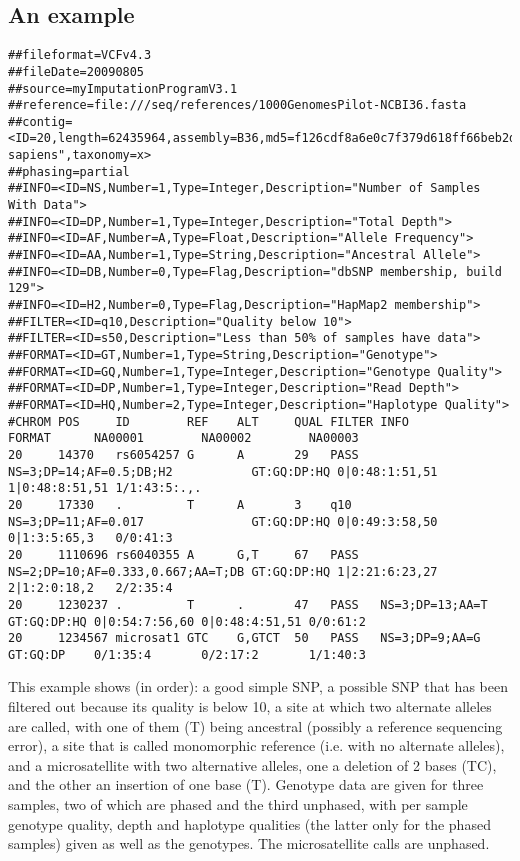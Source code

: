 \documentclass[8pt]{article}
\begin{document}
\subsection{An example}
\scriptsize
\begin{verbatim}
##fileformat=VCFv4.3
##fileDate=20090805
##source=myImputationProgramV3.1
##reference=file:///seq/references/1000GenomesPilot-NCBI36.fasta
##contig=<ID=20,length=62435964,assembly=B36,md5=f126cdf8a6e0c7f379d618ff66beb2da,species="Homo sapiens",taxonomy=x>
##phasing=partial
##INFO=<ID=NS,Number=1,Type=Integer,Description="Number of Samples With Data">
##INFO=<ID=DP,Number=1,Type=Integer,Description="Total Depth">
##INFO=<ID=AF,Number=A,Type=Float,Description="Allele Frequency">
##INFO=<ID=AA,Number=1,Type=String,Description="Ancestral Allele">
##INFO=<ID=DB,Number=0,Type=Flag,Description="dbSNP membership, build 129">
##INFO=<ID=H2,Number=0,Type=Flag,Description="HapMap2 membership">
##FILTER=<ID=q10,Description="Quality below 10">
##FILTER=<ID=s50,Description="Less than 50% of samples have data">
##FORMAT=<ID=GT,Number=1,Type=String,Description="Genotype">
##FORMAT=<ID=GQ,Number=1,Type=Integer,Description="Genotype Quality">
##FORMAT=<ID=DP,Number=1,Type=Integer,Description="Read Depth">
##FORMAT=<ID=HQ,Number=2,Type=Integer,Description="Haplotype Quality">
#CHROM POS     ID        REF    ALT     QUAL FILTER INFO                              FORMAT      NA00001        NA00002        NA00003
20     14370   rs6054257 G      A       29   PASS   NS=3;DP=14;AF=0.5;DB;H2           GT:GQ:DP:HQ 0|0:48:1:51,51 1|0:48:8:51,51 1/1:43:5:.,.
20     17330   .         T      A       3    q10    NS=3;DP=11;AF=0.017               GT:GQ:DP:HQ 0|0:49:3:58,50 0|1:3:5:65,3   0/0:41:3
20     1110696 rs6040355 A      G,T     67   PASS   NS=2;DP=10;AF=0.333,0.667;AA=T;DB GT:GQ:DP:HQ 1|2:21:6:23,27 2|1:2:0:18,2   2/2:35:4
20     1230237 .         T      .       47   PASS   NS=3;DP=13;AA=T                   GT:GQ:DP:HQ 0|0:54:7:56,60 0|0:48:4:51,51 0/0:61:2
20     1234567 microsat1 GTC    G,GTCT  50   PASS   NS=3;DP=9;AA=G                    GT:GQ:DP    0/1:35:4       0/2:17:2       1/1:40:3
\end{verbatim}
\normalsize
This example shows (in order): a good simple SNP, a possible SNP that has been filtered out because its quality is below 10, a site at which two alternate alleles are called, with one of them (T) being ancestral (possibly a reference sequencing error), a site that is called monomorphic reference (i.e. with no alternate alleles), and a microsatellite with two alternative alleles, one a deletion of 2 bases (TC), and the other an insertion of one base (T). Genotype data are given for three samples, two of which are phased and the third unphased, with per sample genotype quality, depth and haplotype qualities (the latter only for the phased samples) given as well as the genotypes. The microsatellite calls are unphased.
\end{document}
